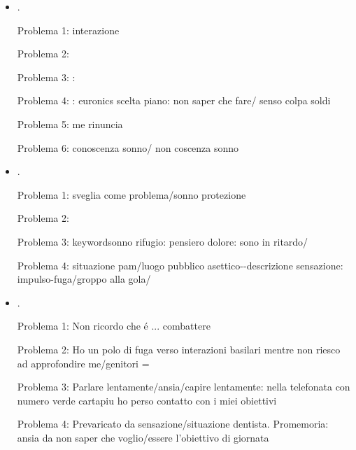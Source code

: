 \begin{itemize}
Problema 2: Perch\'e scegliere?

Problema 3: condizione situazione paralisi

Problema 4: me -> interazione -> incontro

Problema 5: Le cose di cui vorrei parlare ma non mi ricordo

Problema 6: interazioni babbo: aspettazione soddisfazione

\item {}.

Problema 1: interazione 

Problema 2: 

Problema 3: : 

Problema 4: :
euronics scelta piano: non saper che fare/ senso colpa soldi

Problema 5: me rinuncia

Problema 6: conoscenza sonno/ non coscenza sonno


\item {}.

Problema 1: sveglia come problema/sonno protezione

Problema 2: 

Problema 3: keyword{sonno rifugio}: pensiero dolore: sono in ritardo/ 

Problema 4: situazione pam/luogo pubblico asettico--descrizione sensazione: impulso-fuga/groppo alla gola/


\item {}.

Problema 1: Non ricordo che \'e ... combattere

Problema 2: Ho un polo di fuga verso interazioni basilari mentre non riesco ad approfondire me/genitori = 

Problema 3: Parlare lentamente/ansia/capire lentamente: nella telefonata con numero verde cartapiu ho perso contatto con i miei obiettivi

Problema 4: Prevaricato da sensazione/situazione dentista. Promemoria: ansia da non saper che voglio/essere l'obiettivo di giornata


\end{itemize}
